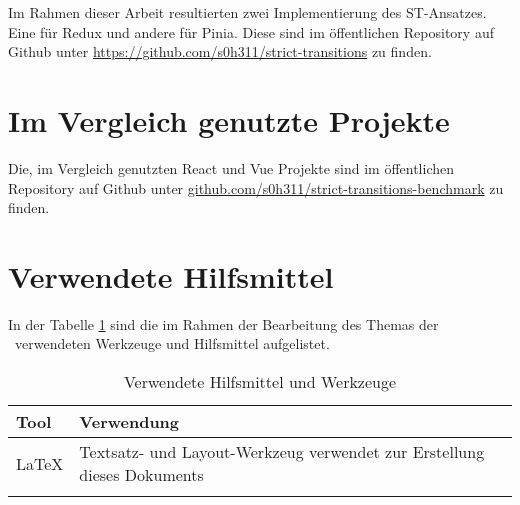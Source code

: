 Im Rahmen dieser Arbeit resultierten zwei Implementierung des ST-Ansatzes. Eine für Redux und andere für Pinia. Diese sind im öffentlichen Repository auf Github unter \url{https://github.com/s0h311/strict-transitions} zu finden.

\section{Im Vergleich genutzte Projekte}

Die, im Vergleich genutzten React und Vue Projekte sind im öffentlichen Repository auf Github unter \url{github.com/s0h311/strict-transitions-benchmark} zu finden.

\section{Verwendete Hilfsmittel}
In der Tabelle \ref{tab:tooling} sind die im Rahmen der Bearbeitung des Themas der \IthesisKindDE~verwendeten Werkzeuge und Hilfsmittel aufgelistet.

\begin{table}[h!]
\caption{Verwendete Hilfsmittel und Werkzeuge}
\begin{tabular}{|l|l|}
\hline 
\rowcolor{lightgray} Tool & Verwendung \\
\hline
\LaTeX & Textsatz- und Layout-Werkzeug verwendet zur Erstellung dieses Dokuments \\
\hline
 & \\
\hline
\end{tabular}
\label{tab:tooling}
\end{table}

